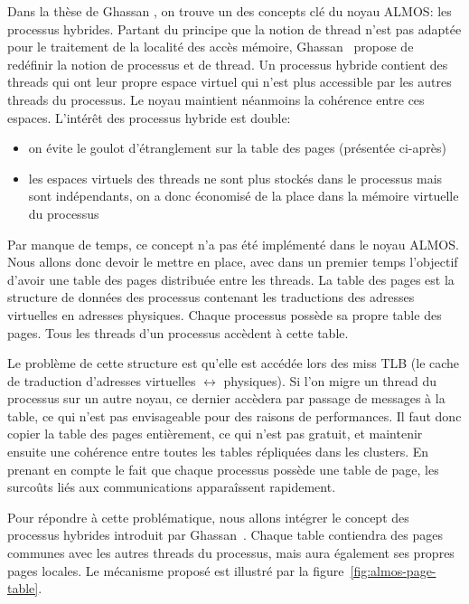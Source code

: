       Dans la thèse de Ghassan \citet{almaless2014universite}, on trouve un des
      concepts clé du noyau ALMOS: les processus hybrides. Partant du principe
      que la notion de thread n'est pas adaptée pour le traitement de la
      localité des accès mémoire, Ghassan~\citeauthor{almaless2014universite}
      propose de redéfinir la notion de processus et de thread. Un processus
      hybride contient des threads qui ont leur propre espace virtuel qui n'est
      plus accessible par les autres threads du processus. Le noyau maintient
      néanmoins la cohérence entre ces espaces. L'intérêt des processus hybride
      est double:
      \begin{itemize}
        \item on évite le goulot d'étranglement sur la table des pages
          (présentée ci-après)
        \item les espaces virtuels des threads ne sont plus stockés dans le
          processus mais sont indépendants, on a donc économisé de la place dans
          la mémoire virtuelle du processus
      \end{itemize}

      Par manque de temps, ce concept n'a pas été implémenté dans le noyau
      ALMOS. Nous allons donc devoir le mettre en place, avec dans un premier
      temps l'objectif d'avoir une table des pages distribuée entre les
      threads. La table des pages est la structure de données des processus
      contenant les traductions des adresses virtuelles en adresses
      physiques. Chaque processus possède sa propre table des pages. Tous les
      threads d'un processus accèdent à cette table.

      Le problème de cette structure est qu'elle est accédée lors des miss TLB
      (le cache de traduction d'adresses virtuelles $\leftrightarrow$
      physiques). Si l'on migre un thread du processus sur un autre noyau, ce
      dernier accèdera par passage de messages à la table, ce qui n'est pas
      envisageable pour des raisons de performances. Il faut donc copier la
      table des pages entièrement, ce qui n'est pas gratuit, et maintenir
      ensuite une cohérence entre toutes les tables répliquées dans les
      clusters. En prenant en compte le fait que chaque processus possède une
      table de page, les surcoûts liés aux communications apparaîssent
      rapidement.

      Pour répondre à cette problématique, nous allons intégrer le concept des
      processus hybrides introduit par
      Ghassan~\citeauthor{almaless2014universite}. Chaque table contiendra des
      pages communes avec les autres threads du processus, mais aura également
      ses propres pages locales. Le mécanisme proposé est illustré par la
      figure~\ref{fig:almos-page-table}.


